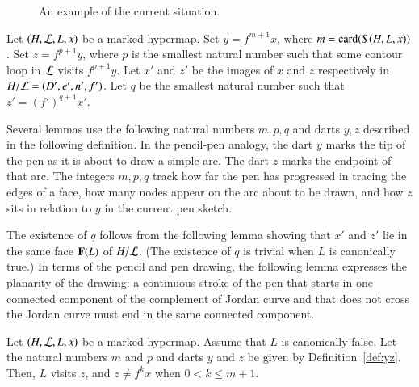 \begin{figure}[htb]
\centering
{}
\caption{An example of the current situation.}
\label{fig:graph-gen}
\end{figure}



\begin{definition}[$m$,~$p$,~$q$,~$y$,~$z$]\label{def:yz}
Let $(H,{\cal L},L,x)$ be a marked hypermap.
Set  $y = f^{m+1} x$, where $m = {\operatorname{card}}(S(H,L,x))$.
  Set
$z=f^{p+1} y$, where $p$ is the smallest natural number 
such that some contour loop in ${\cal L}$ visits $f^{p+1} y$.
Let $x'$ and $z'$ be the images of $x$ and $z$ respectively in $H/{\cal L} = (D',e',n',f')$.
Let $q$ be the smallest natural number such that $z' = (f')^{q+1} x'$.  
\end{definition}

Several lemmas use the following natural numbers $m,p,q$ and darts
$y,z$ described in the following definition.  In the pencil-pen
analogy, the dart $y$ marks the tip of the pen as it is about to draw
a simple arc. The dart $z$ marks the endpoint of that arc.  The
integers $m,p,q$ track how far the pen has progressed in tracing the
edges of a face, how many nodes appear on the arc about to be drawn,
and how $z$ sits in relation to $y$ in the current pen sketch.

The existence of $q$ follows from the following lemma showing that
$x'$ and $z'$ lie in the same face ${\mathbf F}(L)$ of $H/{\cal L}$.  (The
existence of $q$ is trivial when $L$ is canonically true.)  In terms
of the pencil and pen drawing, the following
lemma expresses the planarity of the drawing:
a continuous stroke of the pen that starts in one connected component of
the complement of Jordan curve and that does not cross the Jordan
curve must end in the same connected component.

\begin{lemma} \label{lemma:yz}
  Let $(H,{\cal L},L,x)$ be a marked hypermap.  Assume that $L$ is
  canonically false. %
  Let the natural numbers $m$ and $p$ and darts $y$ and $z$ be given by
  Definition~\ref{def:yz}.  Then, $L$ visits $z$, and $z\ne f^k x$
  when $0 < k \le {m+1}$.
\end{lemma}

